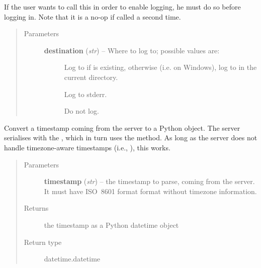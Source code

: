 \documentclass[a4paper,11pt,english]{sphinxmanual}
\begin{document}

\begin{fulllineitems}
\label{programming/remote_client:jb_remote.common.setup_logging}
If the user wants to call this in order to enable logging, he must do
so before logging in.  Note that it is a no-op if called a second time.
\begin{quote}\begin{description}
\item[{Parameters}] \leavevmode
\textbf{destination} (\emph{str}) -- 
Where to log to; possible values are:
\begin{description}
\item[{}] \leavevmode
Log to  if  is existing,
otherwise (i.e. on Windows), log to  in the
current directory.

\item[{}] \leavevmode
Log to stderr.

\item[{}] \leavevmode
Do not log.

\end{description}


\end{description}\end{quote}

\end{fulllineitems}


\begin{fulllineitems}
\label{programming/remote_client:jb_remote.common.parse_timestamp}
Convert a timestamp coming from the server to a Python  object.
The server serialises with the , which in turn uses the
 method.  As long as the server does not handle
timezone-aware timestamps (i.e., ), this works.
\begin{quote}\begin{description}
\item[{Parameters}] \leavevmode
\textbf{timestamp} (\emph{str}) -- the timestamp to parse, coming from the server.  It must
have ISO 8601 format format without timezone information.

\item[{Returns}] \leavevmode
the timestamp as a Python datetime object

\item[{Return type}] \leavevmode
datetime.datetime

\end{description}\end{quote}

\end{fulllineitems}
\end{document}
